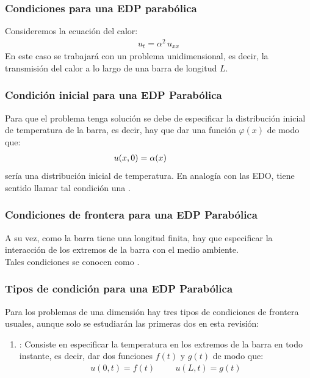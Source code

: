 \documentclass[12pt]{beamer}
\begin{document}
\begin{frame}
\frametitle{Condiciones para una EDP parabólica}
Consideremos la ecuación del calor:
\pause
\begin{align*}
u_{t} =  \alpha^{2} \,  u_{xx}
\end{align*}
En este caso se trabajará con un problema unidimensional, es decir, la transmisión del calor a lo largo de una barra de longitud $L$.
\end{frame}
\begin{frame}
\frametitle{Condición inicial para una EDP Parabólica}
Para que el problema tenga solución se debe de especificar la distribución inicial de temperatura de la barra, es decir, hay que dar una función $\varphi (x)$ de modo que:
\pause
\begin{align}
u (x, 0) = \alpha (x) \hspace{1.5cm} 
\label{eq:ecuacion_06_02_02}
\end{align}
sería una distribución inicial de temperatura. \pause En analogía con las EDO, tiene sentido llamar tal condición una .
\end{frame}
\begin{frame}
\frametitle{Condiciones de frontera para una EDP Parabólica}
A su vez, como la barra tiene una longitud finita, hay que especificar la interacción de los extremos de la barra con el medio ambiente.
\\
\bigskip
\pause
Tales condiciones se conocen como .
\end{frame}
\begin{frame}
\frametitle{Tipos de condición para una EDP Parabólica}
Para los problemas de una dimensión hay tres tipos de condiciones de frontera usuales, aunque solo se estudiarán las primeras dos en esta revisión:
\begin{enumerate}[<+->]
\item {}: Consiste en especificar la temperatura en los extremos de la barra en todo instante, es decir, dar dos funciones $f(t)$ y $g(t)$ de modo que:
\begin{align}
u(0, t) = f (t)  \hspace{1cm} u(L, t) = g(t)
\label{eq:ecuacion_06_02_03}    
\end{align}
\seti
\end{enumerate}
\end{frame}
\end{document}
